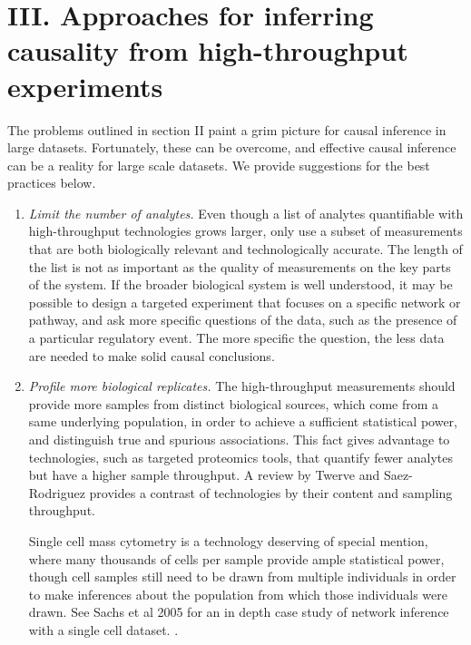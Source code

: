 \documentclass[journal=jacsat,manuscript=article]{achemso}
\def\added#1{{\color{blue} #1}}
\begin{document}
\section{III. Approaches for inferring causality from high-throughput experiments}

The problems outlined in section II paint a grim picture for causal inference in large datasets. Fortunately, these can be overcome, and effective causal inference can be a reality for large scale datasets.  We provide suggestions for the best practices below.

\begin{enumerate}
\item \textit{Limit the number of analytes.} Even though a list of analytes quantifiable with high-throughput technologies grows larger, only use a subset of measurements that are both biologically relevant and technologically accurate. The length of the list is not as important as the quality of measurements on the key parts of the system.  If the broader biological system is well understood, it may be possible to design a targeted experiment that focuses on a specific network or pathway, and ask more specific questions of the data, such as the presence of a particular regulatory event.  The more specific the question, the less data are needed to make solid causal conclusions.  

\item \textit{Profile more biological replicates.}  The high-throughput measurements should provide more samples from distinct biological sources, which come from a same underlying population, in order to achieve a sufficient statistical power, and distinguish true and spurious associations.  This fact gives advantage to technologies, such as targeted proteomics tools, that quantify fewer analytes but have a higher sample throughput.  \added{A review by Twerve and Saez-Rodriguez provides a contrast of technologies by their content and sampling throughput\cite{SaezRodriguez:2012kx}.} 

\added{Single cell mass cytometry is a technology deserving of special mention, where many thousands of cells per sample provide ample statistical power, though cell samples still need to be drawn from multiple individuals in order to make inferences about the population from which those individuals were drawn}. See Sachs et al 2005 for an in depth case study of network inference with a single cell dataset. \cite{sachs2005causal}.  


\end{enumerate}
\end{document}
